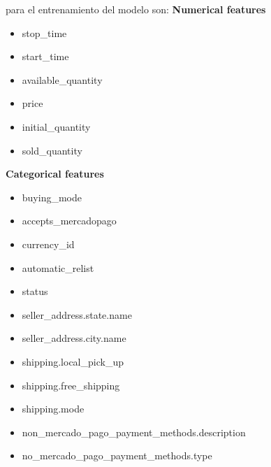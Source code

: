 \documentclass[a4paper,10pt]{article}
\begin{document}
para el entrenamiento del modelo son: \newline
\textbf{Numerical features}
\begin{itemize}
    \item stop\_time
    \item start\_time
    \item available\_quantity
    \item price
    \item initial\_quantity
    \item sold\_quantity
\end{itemize}
\textbf{Categorical features}
\begin{itemize}
    \item buying\_mode
    \item accepts\_mercadopago
    \item currency\_id
    \item automatic\_relist
    \item status
    \item seller\_address.state.name
    \item seller\_address.city.name
    \item shipping.local\_pick\_up
    \item shipping.free\_shipping
    \item shipping.mode
    \item non\_mercado\_pago\_payment\_methods.description
    \item no\_mercado\_pago\_payment\_methods.type
\end{itemize}
                       
\end{document}
